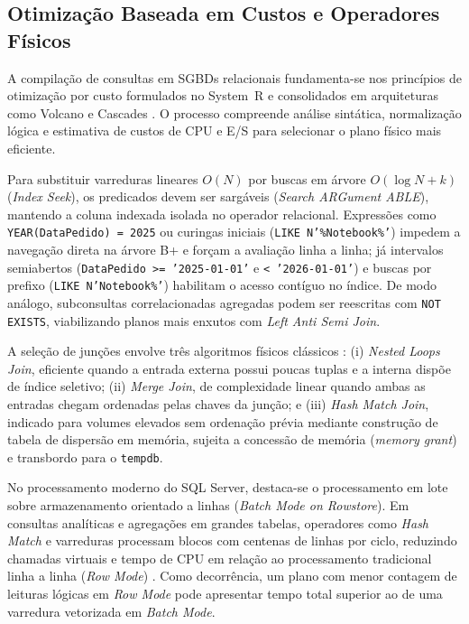\documentclass[12pt]{article}
\begin{document}
\subsection{Otimização Baseada em Custos e Operadores Físicos}

A compilação de consultas em SGBDs relacionais fundamenta-se nos princípios de otimização por custo formulados no System~R e consolidados em arquiteturas como Volcano e Cascades \cite{selinger:79,graefe:93,chaudhuri:98}. O processo compreende análise sintática, normalização lógica e estimativa de custos de CPU e E/S para selecionar o plano físico mais eficiente.

Para substituir varreduras lineares $O(N)$ por buscas em árvore $O(\log N + k)$ (\textit{Index Seek}), os predicados devem ser sargáveis (\textit{Search ARGument ABLE}), mantendo a coluna indexada isolada no operador relacional. Expressões como \texttt{YEAR(DataPedido) = 2025} ou curingas iniciais (\texttt{LIKE N'\%Notebook\%'}) impedem a navegação direta na árvore B+ e forçam a avaliação linha a linha; já intervalos semiabertos (\texttt{DataPedido >= '2025-01-01'} e \texttt{< '2026-01-01'}) e buscas por prefixo (\texttt{LIKE N'Notebook\%'}) habilitam o acesso contíguo no índice. De modo análogo, subconsultas correlacionadas agregadas podem ser reescritas com \texttt{NOT EXISTS}, viabilizando planos mais enxutos com \textit{Left Anti Semi Join}.

A seleção de junções envolve três algoritmos físicos clássicos \cite{graefe:93,ramakrishnan:03}: (i) \textit{Nested Loops Join}, eficiente quando a entrada externa possui poucas tuplas e a interna dispõe de índice seletivo; (ii) \textit{Merge Join}, de complexidade linear quando ambas as entradas chegam ordenadas pelas chaves da junção; e (iii) \textit{Hash Match Join}, indicado para volumes elevados sem ordenação prévia mediante construção de tabela de dispersão em memória, sujeita a concessão de memória (\textit{memory grant}) e transbordo para o \texttt{tempdb}.

No processamento moderno do SQL Server, destaca-se o processamento em lote sobre armazenamento orientado a linhas (\textit{Batch Mode on Rowstore}). Em consultas analíticas e agregações em grandes tabelas, operadores como \textit{Hash Match} e varreduras processam blocos com centenas de linhas por ciclo, reduzindo chamadas virtuais e tempo de CPU em relação ao processamento tradicional linha a linha (\textit{Row Mode}) \cite{graefe:93,microsoft:22}. Como decorrência, um plano com menor contagem de leituras lógicas em \textit{Row Mode} pode apresentar tempo total superior ao de uma varredura vetorizada em \textit{Batch Mode}.
\end{document}
